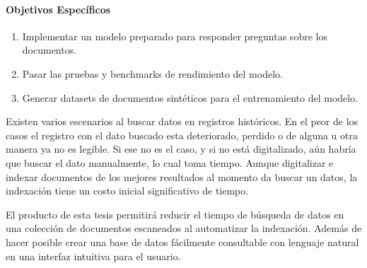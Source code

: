 \documentclass[../main.tex]{subfiles}
\begin{document}
\paragraph{Objetivos Específicos}

\begin{enumerate}
    \item Implementar un modelo preparado para responder preguntas sobre los documentos.
    \item Pasar las pruebas y benchmarks de rendimiento del modelo.
    \item Generar datasets de documentos sintéticos para el entrenamiento del modelo.
\end{enumerate}

%


Existen varios escenarios al buscar datos en registros históricos.
En el peor de los casos el registro con el dato buscado esta deteriorado, perdido o de alguna u otra manera ya no es legible.
Si ese no es el caso, y si no está digitalizado, aún habría que buscar el dato manualmente, lo cual toma tiempo.
Aunque digitalizar e indexar documentos de los mejores resultados al momento da buscar un datos, la indexación 
tiene un costo inicial significativo de tiempo.

El producto de esta tesis permitirá reducir el tiempo de búsqueda de datos en una
colección de documentos escaneados al automatizar la indexación.
Además de hacer posible crear una base de datos fácilmente consultable con lenguaje natural en una interfaz intuitiva para el usuario.
\end{document}
